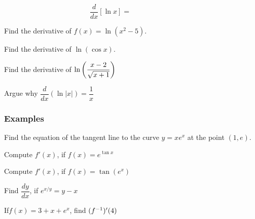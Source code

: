 \documentclass[notes]{subfiles}
\begin{document}
		\begin{rmk}[Derivative of \(\ln x\)]
			\[\dfrac{d}{dx}[\ln x] =\qquad\qquad\qquad \]
		\end{rmk}
		
		\begin{pf}
			\vspace{2.5in}
		\end{pf}
		
		\begin{ex}
			Find the derivative of \(f(x) = \ln (x^2-5)\).
		\end{ex}
			\newpage
	
		\begin{ex}
			Find the derivative of \(\ln (\cos x)\).
		\end{ex}
			
		\begin{ex}
			Find the derivative of \(\ln \left( \dfrac{x-2}{\sqrt{x+1}}\right)\)
		\end{ex}
			
		\begin{ex}
			Argue why $\dfrac{d}{dx} (\ln |x|) = \dfrac{1}{x}$
		\end{ex}
			\newpage
			
	\subsubsection*{Examples}
		\begin{ex}
			Find the equation of the tangent line to the curve \(y = xe^x\) at the point \((1,e)\).
		\end{ex}
			
		\begin{ex}
			Compute \(f'(x)\), if \(f(x) = e^{\tan x}\)
		\end{ex}
			
		\begin{ex}
			Compute \(f'(x)\), if \(f(x) = \tan (e^x)\)
		\end{ex}
			
			\newpage
			
		\begin{ex}
			Find \(\dfrac{dy}{dx}\), if \(e^{x/y} = y - x\)
		\end{ex}
			
		\begin{ex}
			If\(f(x) = 3 + x + e^x\), find \((f^{-1})'(4)\)
		\end{ex}
			
\end{document}

